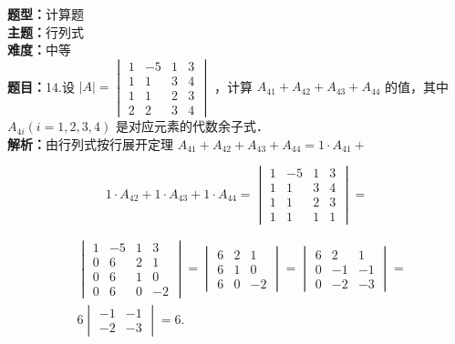 \documentclass{ctexart}
\newenvironment{question}[5]{%
	\noindent\textbf{题型：}#1\\
	\textbf{主题：}#2\\
	\textbf{难度：}#3\\
	\textbf{题目：}#4\\
	\textbf{解析：}#5\\
	\vspace{1em}
}{}
\begin{document}
	\begin{question}
		{计算题}
		{行列式}
		{中等}
		{14.设 $|A|=\begin{vmatrix}1 & -5 & 1 & 3 \\ 1 & 1 & 3 & 4 \\ 1 & 1 & 2 & 3 \\ 2 & 2 & 3 & 4\end{vmatrix}$ ，计算 $A_{41}+A_{42}+A_{43}+A_{44}$ 的值，其中 $A_{4 i}(i=1,2,3,4)$ 是对应元素的代数余子式．}
		{由行列式按行展开定理 $A_{41}+A_{42}+A_{43}+A_{44}=1 \cdot A_{41}+$
			
			$$
			1 \cdot A_{42}+1 \cdot A_{43}+1 \cdot A_{44}=\begin{vmatrix}
				1 & -5 & 1 & 3 \\
				1 & 1 & 3 & 4 \\
				1 & 1 & 2 & 3 \\
				1 & 1 & 1 & 1
			\end{vmatrix}=
			$$
			
			
			$$
			\begin{aligned}
				& \begin{vmatrix}
					1 & -5 & 1 & 3 \\
					0 & 6 & 2 & 1 \\
					0 & 6 & 1 & 0 \\
					0 & 6 & 0 & -2
				\end{vmatrix}=\begin{vmatrix}
					6 & 2 & 1 \\
					6 & 1 & 0 \\
					6 & 0 & -2
				\end{vmatrix}=\begin{vmatrix}
					6 & 2 & 1 \\
					0 & -1 & -1 \\
					0 & -2 & -3
				\end{vmatrix}= \\
				& 6\begin{vmatrix}
					-1 & -1 \\
					-2 & -3
				\end{vmatrix}=6 .
			\end{aligned}
			$$}
	\end{question}
	
	
\end{document}
